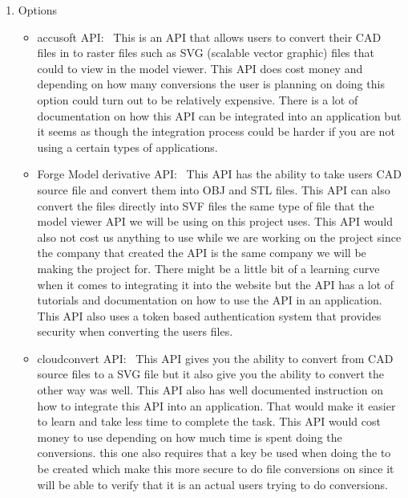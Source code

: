 \documentclass[letterpaper, 10pt, draftclsnofoot, compsoc, onecolumn]{IEEEtran}
\begin{document}
		\begin{enumerate}
			\item{Options}
				\begin{itemize}

					\item accusoft API:~\cite{accusoft2016} This is an API that allows users to convert their CAD files in to raster files such as SVG (scalable vector graphic) files that could 
						to view in the model viewer. This API does cost money and depending on how many conversions the user is planning on doing this option
						could turn out to be relatively expensive. There is a lot of documentation on how this API can be integrated into an application but it seems
						as though the integration process could be harder if you are not using a certain types of applications.

					\item  Forge Model derivative API:~\cite{forge2016} This API has the ability to take users CAD source file and convert them into OBJ and STL files. This API can also
						convert the files directly into SVF files the same type of file that the model viewer API we will be using on this project uses. This API would 
						also not cost us anything to use while we are working on the project since the company that created the API is the same company we will 
						be making the project for. There might be a little bit of a learning curve when it comes to integrating it into the website but the API has a 
						lot of tutorials and documentation on how to use the API in an application.  This API also uses a token based authentication system that
						provides security when converting the users files. 

					\item  cloudconvert API:~\cite{cloudconvert2016} This API gives you the ability to convert from CAD source files to a SVG file but it also give you the ability to convert the 
						other way was well. This API also has well documented instruction on how to integrate this API into an application. That would make it easier
						to learn and take less time to complete the task. This API would cost money to use depending on how much time is spent doing the conversions.
						this one also requires that a key be used when doing the to be created which make this more secure to do file conversions on since it will be able 
						to verify that it is an actual users trying to do conversions. 


\end{itemize}
\end{enumerate}
\end{document}

